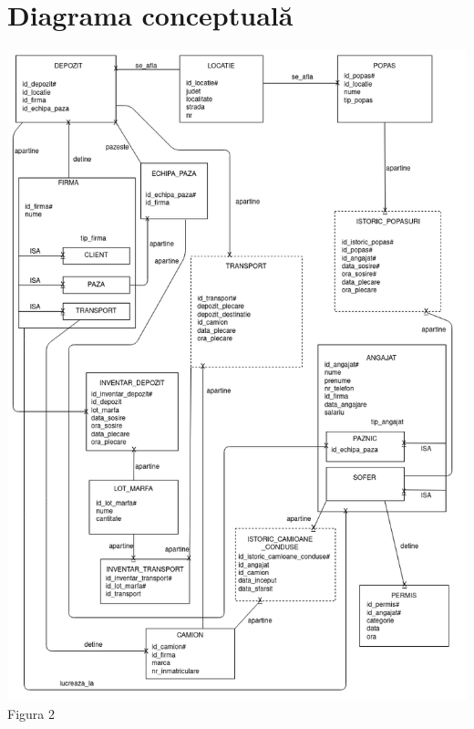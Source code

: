 \documentclass[12pt, a4paper]{article}
\begin{document}
\justify

\section{Diagrama conceptuală}
\includegraphics[width=\textwidth]{_diagrama_conceptuala.png}
\label{Figura 2}
\centering Figura 2

\justify
\end{document}
